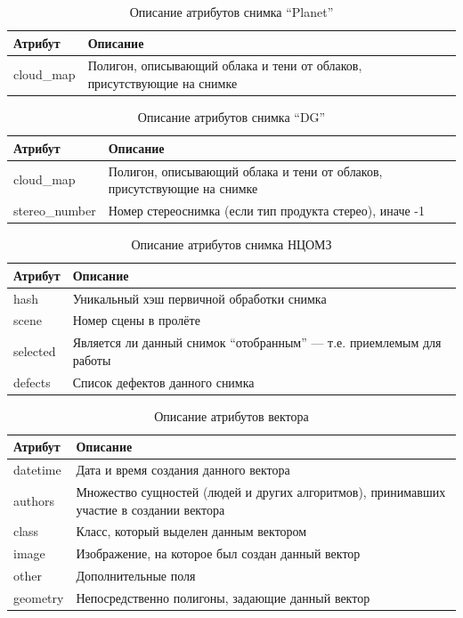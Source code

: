 \documentclass[a4paper]{article}
\begin{document}
\begin{table}[h]
	\begin{tabular}{|C{0.20\textwidth}|p{0.75\textwidth}|}
		\hline
		Атрибут & \centering\arraybackslash Описание \\
		\hline
		cloud\_map & Полигон, описывающий облака и тени от облаков, присутствующие на снимке \\
		\hline
	\end{tabular}
	\caption{Описание атрибутов снимка ``Planet''}
\end{table}

\begin{table}[h]
	\begin{tabular}{|C{0.20\textwidth}|p{0.75\textwidth}|}
		\hline
		Атрибут & \centering\arraybackslash Описание \\
		\hline
		cloud\_map & Полигон, описывающий облака и тени от облаков, присутствующие на снимке \\
		\hline
		stereo\_number & Номер стереоснимка (если тип продукта стерео), иначе -1 \\
		\hline
	\end{tabular}
	\caption{Описание атрибутов снимка ``DG''}
\end{table}

\begin{table}[h]
	\begin{tabular}{|C{0.20\textwidth}|p{0.75\textwidth}|}
		\hline
		Атрибут & \centering\arraybackslash Описание \\
		\hline
		hash & Уникальный хэш первичной обработки снимка \\
		\hline
		scene & Номер сцены в пролёте \\
		\hline
		selected & Является ли данный снимок ``отобранным'' --- т.е. приемлемым для работы \\
		\hline
		defects & Список дефектов данного снимка \\
		\hline
	\end{tabular}
	\caption{Описание атрибутов снимка НЦОМЗ}
\end{table}


\begin{table}[h]
	\begin{tabular}{|C{0.20\textwidth}|p{0.75\textwidth}|}
		\hline
		Атрибут & \centering\arraybackslash Описание \\
		\hline
		datetime & Дата и время создания данного вектора \\
		\hline
		authors & Множество сущностей (людей и других алгоритмов), принимавших участие в создании вектора \\
		\hline
		class & Класс, который выделен данным вектором \\
		\hline
		image & Изображение, на которое был создан данный вектор \\
		\hline
		other & Дополнительные поля \\
		\hline
		geometry & Непосредственно полигоны, задающие данный вектор \\
		\hline
	\end{tabular}
	\caption{Описание атрибутов вектора}
\end{table}
\end{document}
